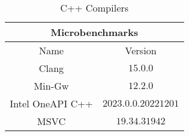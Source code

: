 \begin{table}[H]
    \centering
    \begin{tabular}{|| c | c ||}
    \hline
    \multicolumn{2}{||c||}{Microbenchmarks} \\ [0.5ex] \hline\hline
    Name & Version \\\hline
    Clang & $15.0.0$ \\
    Min-Gw & $12.2.0$ \\
    Intel OneAPI C++ & $2023.0.0.20221201$ \\
    MSVC & $19.34.31942$ \\\hline
    \end{tabular}
    \caption{C++ Compilers}
    \label{tab:compilers}
\end{table}